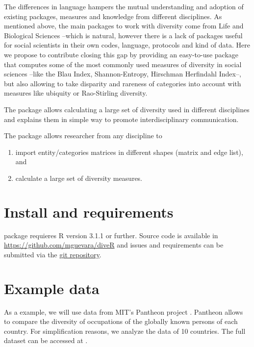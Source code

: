 The differences in language hampers the mutual understanding and adoption of existing packages, measures and knowledge from different disciplines. As mentioned above, the main packages to work with diversity come from Life and Biological Sciences --which is natural, however there is a lack of packages useful for social scientists in their own codes, language, protocols and kind of data. Here we propose to contribute closing this gap by providing an easy-to-use package that computes some of the most commonly used measures of diversity in social sciences --like the Blau Index, Shannon-Entropy, Hirschman Herfindahl Index--, but also allowing to take disparity and rareness of categories into account with measures like ubiquity or Rao-Stirling diversity.


The  package allows calculating a large set of diversity used in different disciplines and explains them in simple way to promote interdisciplinary communication.

The  package allows researcher from any discipline to 
\begin{enumerate}
  \item import entity/categories matrices in different shapes (matrix and edge list), and
  \item calculate a large set of diversity measures. 
\end{enumerate}




\section{Install and requirements}
 package requieres R version 3.1.1 or further. 
Source code is available in \url{https://github.com/mguevara/diveR} and issues and requirements can be submitted via the \href{https://github.com/mguevara/diveR/issues}{git repository}.

\section{Example data}
As a example, we will use data from MIT's Pantheon project \citep{macroconnections_mit_medialab_pantheon_2014}. Pantheon allows to compare the diversity of occupations of the globally known persons of each country. For simplification reasons, we analyze the data of 10 countries. The full dataset can be accessed at \cite{yu_pantheon:_2015}.

